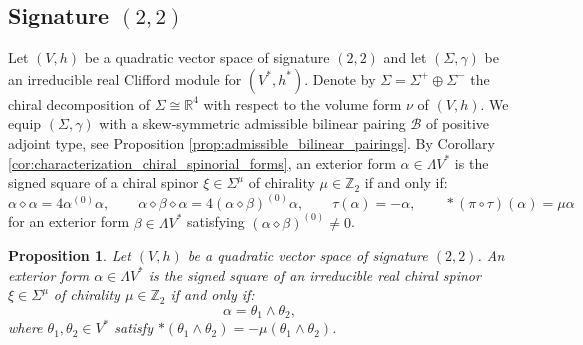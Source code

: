 \documentclass[10pt,reqno]{amsart}
\newtheorem{proposition}[theorem]{Proposition}
\theoremstyle{definition}
\theoremstyle{remark}
\newcommand{\Z}{\mathbb{Z}}
\newcommand{\R}{\mathbb{R}}
\begin{document}
\subsection{Signature \texorpdfstring{$(2,2)$}{(2,2)}}

Let $(V,h)$ be a quadratic vector space of signature $(2,2)$ and let $(\Sigma,\gamma)$ be an irreducible real Clifford module for $(V^*,h^*)$. Denote by $\Sigma=\Sigma^+\oplus\Sigma^-$ the chiral decomposition of $\Sigma\cong\R^4$ with respect to the volume form $\nu$ of $(V,h)$. We equip $(\Sigma,\gamma)$ with a skew-symmetric admissible bilinear pairing $\mathscr{B}$ of positive adjoint type, see Proposition \ref{prop:admissible_bilinear_pairings}. By Corollary \ref{cor:characterization_chiral_spinorial_forms}, an exterior form $\alpha\in\Lambda V^*$ is the signed square of a chiral spinor $\xi\in\Sigma^\mu$ of chirality $\mu\in\Z_2$ if and only if: $$\alpha\diamond\alpha=4\alpha^{(0)}\alpha,\qquad \alpha\diamond\beta\diamond\alpha=4(\alpha\diamond\beta)^{(0)}\alpha,\qquad\tau(\alpha)=-\alpha,\qquad*(\pi\circ\tau)(\alpha)=\mu\alpha$$ for an exterior form $\beta\in\Lambda V^*$ satisfying $(\alpha\diamond\beta)^{(0)}\neq0$.

\begin{proposition}\label{prop:square_(2,2)}
    Let $(V,h)$ be a quadratic vector space of signature $(2,2)$. An exterior form $\alpha\in\Lambda V^*$ is the signed square of an irreducible real chiral spinor $\xi\in\Sigma^\mu$ of chirality $\mu\in\Z_2$ if and only if: $$\alpha=\theta_1\wedge\theta_2,$$ where $\theta_1,\theta_2\in V^*$ satisfy $*(\theta_1\wedge\theta_2)=-\mu(\theta_1\wedge\theta_2)$.
\end{proposition}
\end{document}
